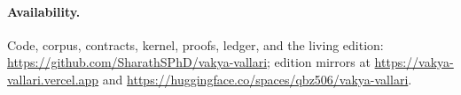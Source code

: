 \documentclass[11pt]{article}
\begin{document}
\paragraph{Availability.} Code, corpus, contracts, kernel, proofs, ledger,
and the living edition: \url{https://github.com/SharathSPhD/vakya-vallari};
edition mirrors at \url{https://vakya-vallari.vercel.app} and
\url{https://huggingface.co/spaces/qbz506/vakya-vallari}.



\end{document}
